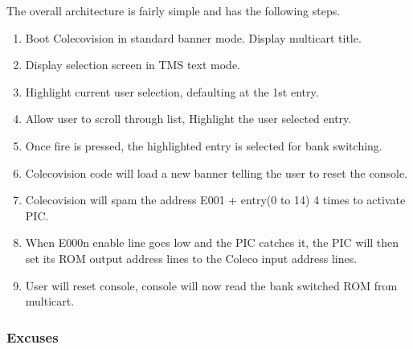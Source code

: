 \documentclass{article}
\begin{document}
  \par
  The overall architecture is fairly simple and has the following steps.

  \begin{enumerate}
    \item Boot Colecovision in standard banner mode. Display multicart title.
    \item Display selection screen in TMS text mode.
    \item Highlight current user selection, defaulting at the 1st entry.
    \item Allow user to scroll through list, Highlight the user selected entry.
    \item Once fire is pressed, the highlighted entry is selected for bank switching.
    \item Colecovision code will load a new banner telling the user to reset the console.
    \item Colecovision will spam the address E001 + entry(0 to 14) 4 times to activate PIC.
    \item When E000n enable line goes low and the PIC catches it, the PIC will then set its ROM output address lines to the Coleco input address lines.
    \item User will reset console, console will now read the bank switched ROM from multicart.
  \end{enumerate}

  \subsubsection{Excuses} \label{Excuses}
\end{document}
